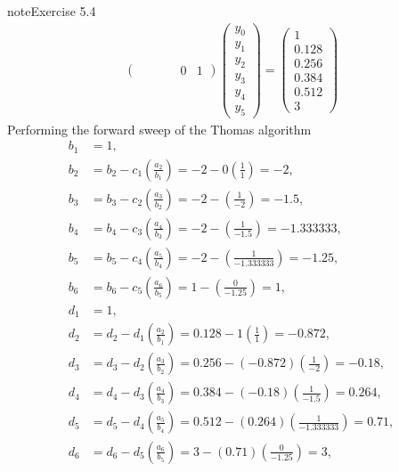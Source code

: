 \documentclass[letterpaper,10pt,english]{jupyterBook}
\begin{document}
\begin{sphinxadmonition}{note}{Exercise 5.4}
\begin{align*}
\begin{pmatrix}
        & & & & 0 & 1
    \end{pmatrix}
    \begin{pmatrix} y_0 \\ y_1 \\ y_2 \\ y_3 \\ y_4 \\ y_5 \end{pmatrix} =
    \begin{pmatrix} 1 \\ 0.128 \\ 0.256 \\ 0.384 \\ 0.512 \\ 3 \end{pmatrix}
\end{align*}
\sphinxAtStartPar
Performing the forward sweep of the Thomas algorithm
\begin{align*}
    b_1 &= 1, \\ 
    b_2 &= b_2 - c_1 \left( \frac{a_2}{b_1} \right) = -2 - 0\left( \frac{1}{1} \right) = -2, \\
    b_3 &= b_3 - c_2 \left( \frac{a_3}{b_2} \right) = -2 - \left( \frac{1}{-2} \right) = -1.5, \\
    b_4 &= b_4 - c_3 \left( \frac{a_4}{b_3} \right) = -2 - \left( \frac{1}{-1.5} \right) = -1.333333, \\
    b_5 &= b_5 - c_4 \left( \frac{a_5}{b_4} \right) = -2 - \left( \frac{1}{-1.333333} \right) = -1.25, \\
    b_6 &= b_6 - c_5 \left( \frac{a_6}{b_5} \right) = 1 - \left( \frac{0}{-1.25} \right) = 1, \\
    d_1 &= 1, \\
    d_2 &= d_2 - d_1 \left( \frac{a_2}{b_1} \right) = 0.128 - 1 \left( \frac{1}{1} \right) = -0.872, \\
    d_3 &= d_3 - d_2 \left( \frac{a_3}{b_2} \right) = 0.256 - (-0.872) \left( \frac{1}{-2} \right) = -0.18, \\
    d_4 &= d_4 - d_3 \left( \frac{a_4}{b_3} \right) = 0.384 - (-0.18) \left( \frac{1}{-1.5} \right) = 0.264, \\
    d_5 &= d_5 - d_4 \left( \frac{a_5}{b_4} \right) = 0.512 - (0.264) \left( \frac{1}{-1.333333} \right) = 0.71, \\
    d_6 &= d_6 - d_5 \left( \frac{a_6}{b_5} \right) = 3 - (0.71) \left( \frac{0}{-1.25} \right) = 3, \\
\end{align*}
\sphinxAtStartPar

\end{sphinxadmonition}
\end{document}

